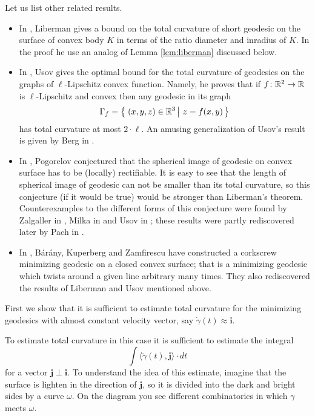 \documentclass[a4paper,10pt]{article}
\begin{document}
Let us list other related results.

\begin{itemize}
\item In \cite{liberman}, Liberman gives a bound on the total curvature of short geodesic on the surface of convex body $K$
in terms of the ratio diameter and inradius of $K$.
In the proof he use an analog of Lemma \ref{lem:liberman} discussed below.

\item In \cite{usov}, 
Usov gives the optimal bound for the total curvature of geodesics on the graphs of $\ell$-Lipschitz convex function. 
Namely, he proves that if $f\colon\mathbb{R}^2\to\mathbb{R}$ is $\ell$-Lipschitz and convex then any 
geodesic in its graph 
\[\Gamma_f=\set{(x,y,z)\in \RR^3}{z=f(x,y)}\] 
has total curvature at most $2\cdot \ell$.
An amusing generalization of Usov's result is given by Berg in \cite{berg}.
\item In \cite{pogorelov}, Pogorelov conjectured 
that the spherical image of geodesic on convex surface has to be (locally) rectifiable.
It is easy to see that the length of spherical image of geodesic can not be smaller than its total curvature, 
so this conjecture (if it would be true) 
would be stronger than Liberman's theorem.
Counterexamples to the different forms of this conjecture were found 
by Zalgaller in \cite{zalgaller},
Milka in \cite{milka}
and Usov in \cite{usov-conj-pog};
these results were partly rediscovered later 
by Pach in \cite{pach}.
\item In \cite{BKZ},
B{\'a}r{\'a}ny,
Kuperberg 
and Zamfirescu 
have constructed a corkscrew minimizing geodesic on a closed convex surface;
that is a minimizing geodesic which twists around a given line arbitrary many times.
They also rediscovered the results of Liberman and Usov mentioned above.
\end{itemize}

First we show that it is sufficient to estimate total curvature for the minimizing geodesics with almost constant velocity vector, say $\dot\gamma(t)\approx\bm{i}$.

To estimate total curvature in this case it is sufficient 
to estimate the integral
\[\int\langle\ddot\gamma(t),\bm{j}\rangle\cdot dt\] 
for a vector $\bm{j}\perp\bm{i}$.
To understand the idea of this estimate, 
imagine that 
the surface is lighten in the direction of $\bm{j}$,
so it is divided into the dark and bright sides 
by a curve $\omega$.
On the diagram you see different combinatorics in which
$\gamma$ meets $\omega$.
\end{document}
